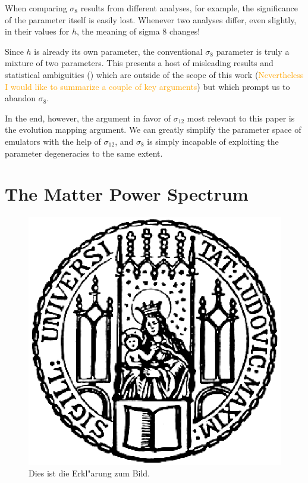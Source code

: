 When comparing $\sigma_8$ results from different analyses, for example, the significance of the parameter itself is easily lost. Whenever two analyses differ, even slightly, in their values for $h$, the meaning of sigma 8 changes!

Since $h$ is already its own parameter, the conventional $\sigma_8$ parameter 
is truly a mixture of two parameters. This presents a host of misleading 
results and statistical ambiguities () which are outside of the 
scope of this work (\textcolor{orange}{Nevertheless I would like to summarize 
a couple of key arguments}) but which prompt us to abandon $\sigma_8$.

In the end, however, the argument in favor of $\sigma_{12}$ most relevant to
this paper is the evolution mapping argument. We can greatly simplify the
parameter space of emulators with the help of $\sigma_{12}$, and $\sigma_8$
is simply incapable of exploiting the parameter degeneracies to the same
extent.
 

\section{The Matter Power Spectrum}
\label{sec: Pk_intro}


\begin{figure}[htb]
  \centering
  \includegraphics[scale=0.5]{siegel}
  \caption[Kurzform f"ur das Abbildungsverzeichnis]{Dies ist die Erkl"arung zum Bild.}
\end{figure}

